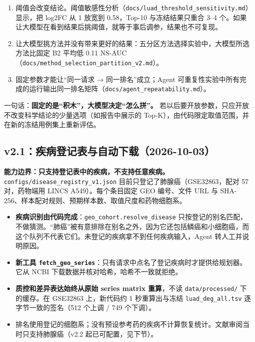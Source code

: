 \documentclass[
  10pt,
]{ctexart}
\providecommand{\tightlist}{%
  \setlength{\itemsep}{0pt}\setlength{\parskip}{0pt}}
\begin{document}
\begin{enumerate}
\def\labelenumi{\arabic{enumi}.}
\tightlist
\item
  阈值会改变结论。阈值敏感性分析（\texttt{docs/\allowbreak{}luad\_\allowbreak{}threshold\_\allowbreak{}sensitivity.\allowbreak{}md}）显示，把
  \textbar log2FC\textbar{} 从 1 放宽到 0.58，Top-10 与冻结结果只重合
  3--4
  个。如果让大模型在看到结果后挑阈值，就等于事后调参，结果也不可复现。
\item
  让大模型挑方法并没有带来更好的结果：五分区方法选择实验中，大模型所选方法比固定
  B2 平均低 0.11
  NS-AUC（\texttt{docs/\allowbreak{}method\_\allowbreak{}selection\_\allowbreak{}partition\_\allowbreak{}v2.\allowbreak{}md}）。
\item
  固定参数才能让``同一请求 → 同一排名''成立；Agent
  可重复性实验中所有完成的运行输出同一排名矩阵（\texttt{docs/\allowbreak{}agent\_\allowbreak{}repeatability.\allowbreak{}md}）。
\end{enumerate}

一句话：\textbf{固定的是``积木''，大模型决定``怎么拼''。}
若以后要开放参数，只应开放不改变科学结论的少量选项（如报告中展示的
Top-K），由代码限定取值范围，并在新的冻结用例集上重新评估。

\subsection{v2.1：疾病登记表与自动下载（2026-10-03）}\label{v21ux75beux75c5ux767bux8bb0ux8868ux4e0eux81eaux52a8ux4e0bux8f7d2026-10-03}

\textbf{能力边界：只支持登记表中的疾病，不支持任意疾病。}
\texttt{configs/\allowbreak{}disease\_\allowbreak{}registry\_\allowbreak{}v1.\allowbreak{}json}
目前只登记了肺腺癌（GSE32863，配对 57 对，药物端用 LINCS
A549）。每个条目固定 GEO 编号、文件 URL 与
SHA-256、样本配对规则、预期样本数、取值尺度和药物细胞系。

\begin{itemize}
\tightlist
\item
  \textbf{疾病识别由代码完成}：\texttt{geo\_\allowbreak{}cohort.\allowbreak{}resolve\_\allowbreak{}disease}
  只按登记的别名匹配，不做猜测。``肺癌''被有意排除在别名之外，因为它还包括鳞癌和小细胞癌，而这个队列不代表它们。未登记的疾病拿不到任何疾病输入，Agent
  转人工并说明原因。
\item
  \textbf{新工具
  \texttt{fetch\_\allowbreak{}geo\_\allowbreak{}series}}：只有请求中点名了登记疾病时才提供给规划器。它从
  NCBI 下载数据并核对哈希，哈希不一致就拒绝。
\item
  \textbf{质控和差异表达始终从原始 series matrix 重算}，不读
  \texttt{data/\allowbreak{}processed/\allowbreak{}} 下的缓存。在 GSE32863 上，新代码约 1
  秒重算出与冻结 \texttt{luad\_\allowbreak{}deg\_\allowbreak{}all.\allowbreak{}tsv} 逐字节一致的签名（512
  个上调 / 749 个下调）。
\item
  排名使用登记的细胞系；没有预设参考药的疾病不计算恢复统计。文献审阅当时只支持肺腺癌（v2.2
  起已可配置，见下节）。
\end{itemize}
\end{document}
